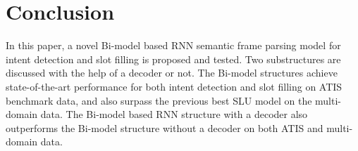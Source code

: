 \documentclass[11pt,a4paper]{article}
\begin{document}
\section{Conclusion}
In this paper, a novel Bi-model based RNN semantic frame parsing model for intent detection and slot filling is proposed and tested. Two substructures are discussed with the help of a decoder or not. The Bi-model structures achieve state-of-the-art performance for both intent detection and slot filling on ATIS benchmark data, and also surpass the previous best SLU model on the multi-domain data. The Bi-model based RNN structure with a decoder also outperforms the Bi-model structure without a decoder on both ATIS and multi-domain data.




\end{document}
